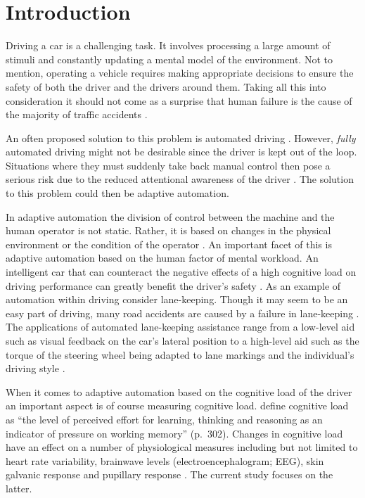 
\section{Introduction}\label{sec:introduction}

Driving a car is a challenging task. 
It involves processing a large amount of stimuli and constantly updating a mental model of the environment.
Not to mention, operating a vehicle requires making appropriate decisions to ensure the safety of both the driver and the drivers around them.
Taking all this into consideration it should not come as a surprise that human failure is the cause of the majority of traffic accidents \citep{DeWaard1996}.

An often proposed solution to this problem is automated driving \citep{Cabrall2018}.
However, \textit{fully} automated driving might not be desirable since the driver is kept out of the loop.
Situations where they must suddenly take back manual control then pose a serious risk due to the reduced attentional awareness of the driver \citep{Dijksterhuis2012}.
The solution to this problem could then be adaptive automation.

In adaptive automation the division of control between the machine and the human operator is not static.
Rather, it is based on changes in the physical environment or the condition of the operator \citep{Sheridan2011}.
An important facet of this is adaptive automation based on the human factor of mental workload.
An intelligent car that can counteract the negative effects of a high cognitive load on driving performance can greatly benefit the driver's safety \citep{Hancock1988}.
As an example of automation within driving consider lane-keeping.
Though it may seem to be an easy part of driving, many road accidents are caused by a failure in lane-keeping \citep{Dijksterhuis2012}.
The applications of automated lane-keeping assistance range from a low-level aid such as visual feedback on the car's lateral position \citep{Dijksterhuis2012} to
a high-level aid such as the torque of the steering wheel being adapted to lane markings and the individual's driving style \citep{Rath2019}.

When it comes to adaptive automation based on the cognitive load of the driver an important aspect is of course measuring cognitive load.
\citet{Haapalainen2010} define cognitive load as ``the level of perceived effort for learning, thinking and reasoning as an indicator of pressure on working memory'' (p.~302).
Changes in cognitive load have an effect on a number of physiological measures including but not limited to heart rate variability, brainwave levels (electroencephalogram; EEG), skin galvanic response and pupillary response \citep{Haapalainen2010}.
The current study focuses on the latter.

